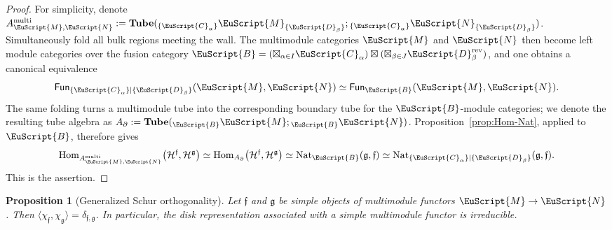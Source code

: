\documentclass[a4paper,11pt]{article}
\newtheorem{proposition}[theorem]{Proposition}
\theoremstyle{definition}
\theoremstyle{remark}
\newcommand\eB           {\EuScript{B}}
\newcommand\eC           {\EuScript{C}}
\newcommand\eD           {\EuScript{D}}
\newcommand\eM          {\EuScript{M}}
\newcommand\eN         {\EuScript{N}}
\newcommand{\Hom}{\operatorname{Hom}}
\newcommand{\Tube}{\mathbf{Tube}}
\newcommand{\Fun}{\mathsf{Fun}}
\begin{document}
\begin{proof}
    For simplicity, denote $A^{\rm multi}_{\eM,\eN} := \mathbf{Tube}({_{\{\eC_{\alpha}\}}} \eM_{\{\eD_{\beta}\}};{_{\{\eC_{\alpha}\}}} \eN_{\{\eD_{\beta}\}})$. Simultaneously fold all bulk regions meeting the wall.  The multimodule categories $\eM$ and $\eN$ then become left module categories over the fusion category $\eB=(\boxtimes_{\alpha\in I}\eC_{\alpha}) \boxtimes ( \boxtimes_{\beta\in J}\eD_{\beta}^{\mathrm{rev}} )$, and one obtains a canonical equivalence
    \begin{equation*}
        \Fun_{\{\eC_\alpha\}|\{\eD_\beta\}}(\eM,\eN) \simeq \Fun_{\eB}(\eM,\eN).
    \end{equation*}
    The same folding turns a multimodule tube into the corresponding
    boundary tube for the $\eB$-module categories; we denote the resulting tube algebra as $A_\partial:=\Tube({}_\eB\eM;{}_\eB\eN)$. Proposition~\ref{prop:Hom-Nat}, applied to
    $\eB$, therefore gives
    \begin{equation*}
        \Hom_{A^{\rm multi}_{\eM,\eN}}
        \bigl(\mathcal H^{\mathfrak f},\mathcal H^{\mathfrak g}\bigr) 
        \simeq  \Hom_{A_\partial} \bigl(\mathcal H^{\mathfrak f},\mathcal H^{\mathfrak g}\bigr)  \simeq \operatorname{Nat}_{\eB}(\mathfrak g,\mathfrak f) 
        \simeq \operatorname{Nat}_{\{\eC_\alpha\}|\{\eD_\beta\}}(\mathfrak g,\mathfrak f).
    \end{equation*}
    This is the assertion. 
\end{proof}


\begin{proposition}[Generalized Schur orthogonality]
    \label{prop:Schur-orth-MMDW}
    Let $\mathfrak f$ and $\mathfrak g$ be simple objects of
    multimodule functors $\eM\to \eN$.  Then $\langle \chi_{\mathfrak f},\chi_{\mathfrak g}\rangle = \delta_{\mathfrak f,\mathfrak g}$.  In particular, the disk representation associated with a simple multimodule functor is irreducible.
\end{proposition}
\end{document}
